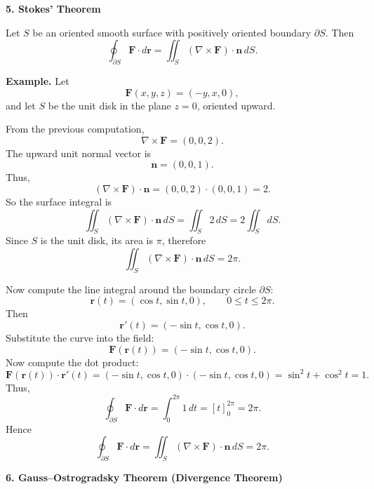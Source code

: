\documentclass[a4paper,12pt]{letter}
\begin{document}
\begin{center}
\end{center}

\textbf{5. Stokes' Theorem}

Let $S$ be an oriented smooth surface with positively oriented boundary $\partial S$. Then
$$\oint_{\partial S}\mathbf{F}\cdot d\mathbf{r}
=
\iint_S (\nabla\times\mathbf{F})\cdot \mathbf{n}\,dS.$$

\textbf{Example.} Let
$$\mathbf{F}(x,y,z)=(-y,x,0),$$
and let $S$ be the unit disk in the plane $z=0$, oriented upward.

From the previous computation,
$$\nabla\times\mathbf{F}=(0,0,2).$$
The upward unit normal vector is
$$\mathbf{n}=(0,0,1).$$
Thus,
$$(\nabla\times\mathbf{F})\cdot\mathbf{n}
=
(0,0,2)\cdot(0,0,1)=2.$$
So the surface integral is
$$\iint_S (\nabla\times\mathbf{F})\cdot \mathbf{n}\,dS
=
\iint_S 2\,dS
=
2\iint_S dS.$$
Since $S$ is the unit disk, its area is $\pi$, therefore
$$\iint_S (\nabla\times\mathbf{F})\cdot \mathbf{n}\,dS
=
2\pi.$$

Now compute the line integral around the boundary circle $\partial S$:
$$\mathbf{r}(t)=(\cos t,\sin t,0),\qquad 0\le t\le 2\pi.$$
Then
$$\mathbf{r}'(t)=(-\sin t,\cos t,0).$$
Substitute the curve into the field:
$$\mathbf{F}(\mathbf{r}(t))
=
(-\sin t,\cos t,0).$$
Now compute the dot product:
$$\mathbf{F}(\mathbf{r}(t))\cdot \mathbf{r}'(t)
=
(-\sin t,\cos t,0)\cdot(-\sin t,\cos t,0)
=
\sin^2 t+\cos^2 t
=
1.$$
Thus,
$$\oint_{\partial S}\mathbf{F}\cdot d\mathbf{r}
=
\int_0^{2\pi}1\,dt
=
[t]_0^{2\pi}
=
2\pi.$$
Hence
$$\oint_{\partial S}\mathbf{F}\cdot d\mathbf{r}
=
\iint_S (\nabla\times\mathbf{F})\cdot \mathbf{n}\,dS
=
2\pi.$$

\begin{center}
\end{center}

\textbf{6. Gauss--Ostrogradsky Theorem (Divergence Theorem)}
\end{document}
